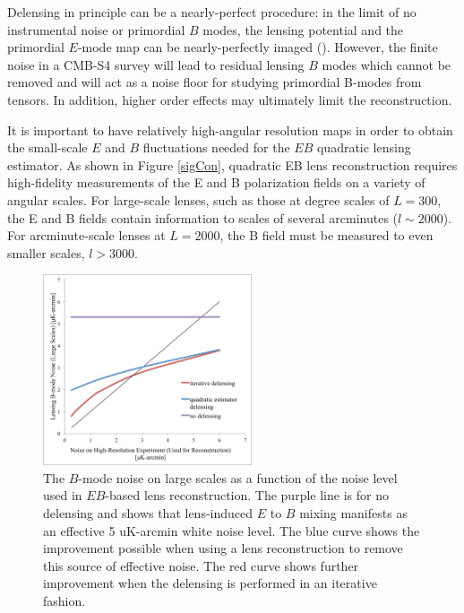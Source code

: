 Delensing in principle can be a nearly-perfect procedure: in the limit of no instrumental noise or primordial $B$ modes, the lensing potential and the primordial $E$-mode map can be nearly-perfectly imaged (\cite{Hirata:2003ka}).  However, the finite noise in a CMB-S4 survey will lead to residual lensing $B$ modes which cannot be removed and will act as a noise floor for studying primordial B-modes from tensors.  In addition, higher order effects may ultimately limit the reconstruction.

It is important to have relatively high-angular resolution maps in order to obtain the small-scale $E$ and $B$ fluctuations needed for the $EB$ quadratic lensing estimator.  As shown in Figure \ref{sigCon}, quadratic EB lens reconstruction requires high-fidelity measurements of the E and B polarization fields on a variety of angular scales.  For large-scale lenses, such as those at degree scales of $L=300$, the E and B fields contain information to scales of several arcminutes ($l \sim 2000$).  For arcminute-scale lenses at $L = 2000$, the B field must be measured to even smaller scales, $l > 3000$. 

\begin{figure}[htbp]
\centering
\includegraphics[width=0.55\textwidth]{CMBLensing/delensPlot.pdf}
\vspace{0.3cm}
\caption{The $B$-mode noise on large scales as a function of the noise level used in $EB$-based lens reconstruction.  The purple line is for no delensing and shows that lens-induced  $E$ to $B$ mixing manifests as an effective 5 uK-arcmin white noise level.  The blue curve shows the improvement possible when using a lens reconstruction to remove this source of effective noise.  The red curve shows further improvement when the delensing is performed in an iterative fashion.}
\label{iterative}
\end{figure}


